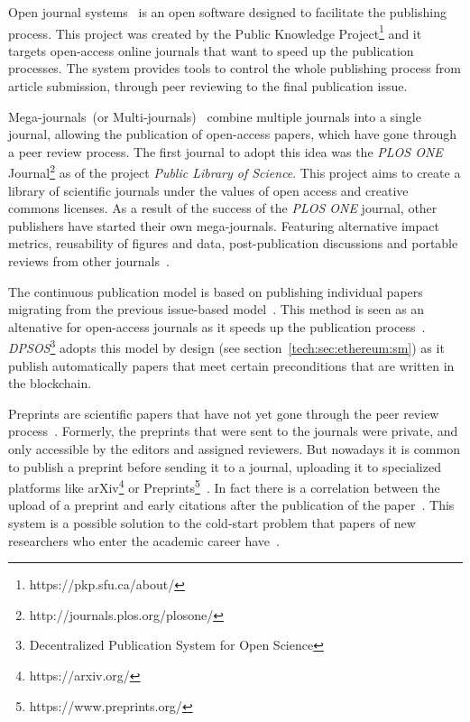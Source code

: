 Open journal systems~\cite{willinsky2005open} is an open software designed to
facilitate the publishing process. This project was created by the Public
Knowledge Project\footnote{https://pkp.sfu.ca/about/} and it targets open-access
online journals that want to speed up the publication processes. The system
provides tools to control the whole publishing process from article submission,
through peer reviewing to the final publication issue.

Mega-journals~(or Multi-journals)~\cite{binfield2013open,wellen2013open} combine
multiple journals into a single journal, allowing the publication of open-access
papers, which have gone through a peer review process. The first journal to
adopt this idea was the \emph{PLOS ONE}
Journal\footnote{http://journals.plos.org/plosone/} as of the project
\emph{Public Library of Science}. This project aims to create a library of
scientific journals under the values of open access and creative commons
licenses. As a result of the success of the \emph{PLOS ONE} journal, other
publishers have started their own mega-journals. Featuring alternative impact
metrics, reusability of figures and data, post-publication discussions and
portable reviews from other journals~\cite{bjork2015have}.

The continuous publication model is based on publishing individual papers
migrating from the previous issue-based model~\cite{anderton2013continuous}.
This method is seen as an altenative for open-access journals as it speeds up
the publication process~\cite{haymanview}. \emph{DPSOS}\footnote{Decentralized
  Publication System for Open Science} adopts this model by design (see
section~\ref{tech:sec:ethereum:sm}) as it publish automatically papers that meet
certain preconditions that are written in the blockchain.

Preprints are scientific papers that have not yet gone through the peer review
process~\cite{harnad2003electronic}. Formerly, the preprints that were sent to
the journals were private, and only accessible by the editors and assigned
reviewers. But nowadays it is common to publish a preprint before sending it to
a journal, uploading it to specialized platforms like
arXiv\footnote{https://arxiv.org/} or
Preprints\footnote{https://www.preprints.org/}~\cite{brown2001volution}. In fact
there is a correlation between the upload of a preprint and early citations
after the publication of the paper~\cite{shuai2012scientific}. This system is a
possible solution to the cold-start problem that papers of new researchers who
enter the academic career have~\cite{sugiyama2010scholarly}.

